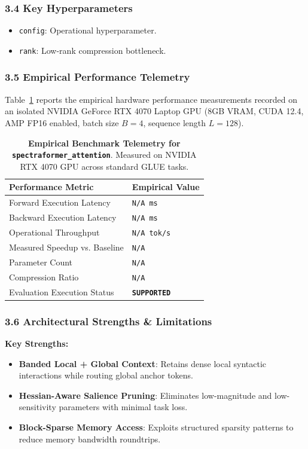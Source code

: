 \subsubsection*{3.4 Key Hyperparameters}
\begin{itemize}
    \item \texttt{config}: Operational hyperparameter.
    \item \texttt{rank}: Low-rank compression bottleneck.
\end{itemize}

\subsubsection*{3.5 Empirical Performance Telemetry}
Table~\ref{tab:telemetry_spectraformer\_attention} reports the empirical hardware performance measurements recorded on an isolated NVIDIA GeForce RTX 4070 Laptop GPU (8GB VRAM, CUDA 12.4, AMP FP16 enabled, batch size $B=4$, sequence length $L=128$).

\begin{table}[h]
\centering
\small
\caption{\textbf{Empirical Benchmark Telemetry for \texttt{spectraformer\_attention}}. Measured on NVIDIA RTX 4070 GPU across standard GLUE tasks.}
\label{tab:telemetry_spectraformer\_attention}
\begin{tabularx}{\columnwidth}{lX}
\toprule
\textbf{Performance Metric} & \textbf{Empirical Value} \\
\midrule
Forward Execution Latency & \texttt{N/A ms} \\
Backward Execution Latency & \texttt{N/A ms} \\
Operational Throughput & \texttt{N/A tok/s} \\
Measured Speedup vs. Baseline & \texttt{N/A} \\
Parameter Count & \texttt{N/A} \\
Compression Ratio & \texttt{N/A} \\
Evaluation Execution Status & \textbf{\texttt{SUPPORTED}} \\
\bottomrule
\end{tabularx}
\end{table}

\subsubsection*{3.6 Architectural Strengths \& Limitations}
\textbf{Key Strengths:}
\begin{itemize}
    \item \textbf{Banded Local + Global Context}: Retains dense local syntactic interactions while routing global anchor tokens.
    \item \textbf{Hessian-Aware Salience Pruning}: Eliminates low-magnitude and low-sensitivity parameters with minimal task loss.
    \item \textbf{Block-Sparse Memory Access}: Exploits structured sparsity patterns to reduce memory bandwidth roundtrips.
\end{itemize}

